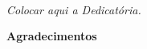 %
%



~
\vfill

\begin{flushright}\textit{Colocar aqui a Dedicatória.}\end{flushright} %


\LIMPA
\newpage

\vspace*{2cm}
\begin{center}
\Large \bf Agradecimentos
\end{center}
\vspace*{1cm} \setlength{\baselineskip}{0.6cm}

\blindtext[3]  %

\LIMPA %
